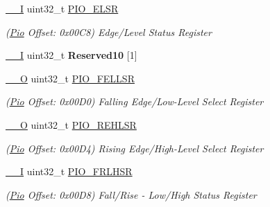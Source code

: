 \begin{DoxyCompactItemize}
\mbox{\label{structPio_a644b8622cf8b765f8b914fc7395f482c}} 
\mbox{\hyperlink{core__cm7_8h_af63697ed9952cc71e1225efe205f6cd3}{\+\_\+\+\_\+I}} uint32\+\_\+t \mbox{\hyperlink{structPio_a644b8622cf8b765f8b914fc7395f482c}{P\+I\+O\+\_\+\+E\+L\+SR}}
\begin{DoxyCompactList}\small\item\em (\mbox{\hyperlink{structPio}{Pio}} Offset\+: 0x00\+C8) Edge/\+Level Status Register \end{DoxyCompactList}\item 
\mbox{\label{structPio_a8c3cedeefc161602647e4dda633b8a1f}} 
\mbox{\hyperlink{core__cm7_8h_af63697ed9952cc71e1225efe205f6cd3}{\+\_\+\+\_\+I}} uint32\+\_\+t {\bfseries Reserved10} \mbox{[}1\mbox{]}
\item 
\mbox{\label{structPio_a98a339e15ad7f6edf3930bc53ed0a535}} 
\mbox{\hyperlink{core__cm7_8h_a7e25d9380f9ef903923964322e71f2f6}{\+\_\+\+\_\+O}} uint32\+\_\+t \mbox{\hyperlink{structPio_a98a339e15ad7f6edf3930bc53ed0a535}{P\+I\+O\+\_\+\+F\+E\+L\+L\+SR}}
\begin{DoxyCompactList}\small\item\em (\mbox{\hyperlink{structPio}{Pio}} Offset\+: 0x00\+D0) Falling Edge/\+Low-\/\+Level Select Register \end{DoxyCompactList}\item 
\mbox{\label{structPio_a4d8a1738c16eeb5fa471fce6ec82a3e9}} 
\mbox{\hyperlink{core__cm7_8h_a7e25d9380f9ef903923964322e71f2f6}{\+\_\+\+\_\+O}} uint32\+\_\+t \mbox{\hyperlink{structPio_a4d8a1738c16eeb5fa471fce6ec82a3e9}{P\+I\+O\+\_\+\+R\+E\+H\+L\+SR}}
\begin{DoxyCompactList}\small\item\em (\mbox{\hyperlink{structPio}{Pio}} Offset\+: 0x00\+D4) Rising Edge/\+High-\/\+Level Select Register \end{DoxyCompactList}\item 
\mbox{\label{structPio_ad5c688463dd28753d83764b26327afb7}} 
\mbox{\hyperlink{core__cm7_8h_af63697ed9952cc71e1225efe205f6cd3}{\+\_\+\+\_\+I}} uint32\+\_\+t \mbox{\hyperlink{structPio_ad5c688463dd28753d83764b26327afb7}{P\+I\+O\+\_\+\+F\+R\+L\+H\+SR}}
\begin{DoxyCompactList}\small\item\em (\mbox{\hyperlink{structPio}{Pio}} Offset\+: 0x00\+D8) Fall/\+Rise -\/ Low/\+High Status Register \end{DoxyCompactList}\item 

\end{DoxyCompactItemize}
